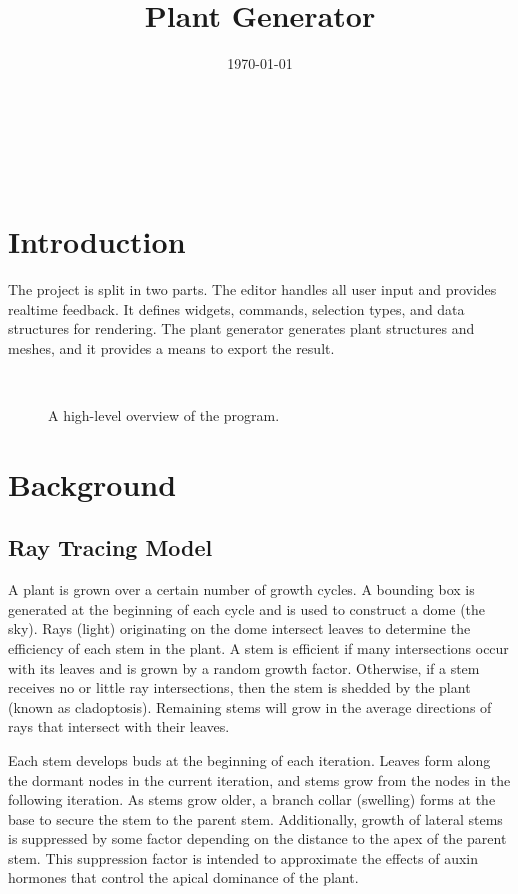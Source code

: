 \documentclass[10pt]{article}
\title{Plant Generator}
\date{\today}
\begin{document}
\begin{center}
  \\
 \vspace{1em}
 \begin{huge} \@title \end{huge} \\
 \vspace{1em}
 \@date
\end{center}
\tableofcontents
\pagebreak

\section{Introduction}

The project is split in two parts. The editor handles all user input and provides realtime feedback. It defines widgets, commands, selection types, and data structures for rendering. The plant generator generates plant structures and meshes, and it provides a means to export the result.

\begin{figure}[H]
\centering
 \\
\caption{A high-level overview of the program.}
\end{figure}

\section{Background}

\subsection{Ray Tracing Model}

A plant is grown over a certain number of growth cycles. A bounding box is generated at the beginning of each cycle and is used to construct a dome (the sky). Rays (light) originating on the dome intersect leaves to determine the efficiency of each stem in the plant. A stem is efficient if many intersections occur with its leaves and is grown by a random growth factor. Otherwise, if a stem receives no or little ray intersections, then the stem is shedded by the plant (known as cladoptosis). Remaining stems will grow in the average directions of rays that intersect with their leaves.

Each stem develops buds at the beginning of each iteration. Leaves form along the dormant nodes in the current iteration, and stems grow from the nodes in the following iteration. As stems grow older, a branch collar (swelling) forms at the base to secure the stem to the parent stem. Additionally, growth of lateral stems is suppressed by some factor depending on the distance to the apex of the parent stem. This suppression factor is intended to approximate the effects of auxin hormones that control the apical dominance of the plant.
\end{document}
